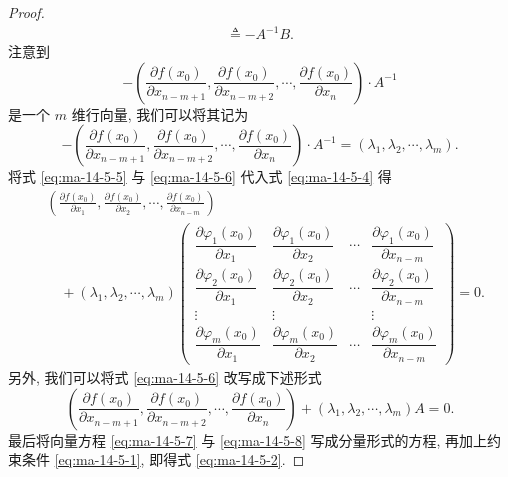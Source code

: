 \begin{proof}
\begin{equation}
\begin{aligned}
  \triangleq -A^{-1}B.
\end{aligned}
\label{eq:ma-14-5-5}
\end{equation}
注意到
\[
  -
  \left(
    \frac{\partial f(x_0)}{\partial x_{n-m+1}},
    \frac{\partial f(x_0)}{\partial x_{n-m+2}},
    \cdots,
    \frac{\partial f(x_0)}{\partial x_n}
  \right)\cdot A^{-1}
\]
是一个 $m$ 维行向量, 我们可以将其记为
\begin{equation}
  -
  \left(
    \frac{\partial f(x_0)}{\partial x_{n-m+1}},
    \frac{\partial f(x_0)}{\partial x_{n-m+2}},
    \cdots,
    \frac{\partial f(x_0)}{\partial x_n}
  \right)\cdot A^{-1}
  =(\lambda_1,\lambda_2,\cdots,\lambda_m).
  \label{eq:ma-14-5-6}
\end{equation}
将式 \eqref{eq:ma-14-5-5} 与 \eqref{eq:ma-14-5-6} 代入式 \eqref{eq:ma-14-5-4} 得
\begin{equation}
\begin{aligned}
  &\left(
    \frac{\partial f(x_0)}{\partial x_1},
    \frac{\partial f(x_0)}{\partial x_2},
    \cdots,
    \frac{\partial f(x_0)}{\partial x_{n-m}}
  \right)\\
  &\quad+
  (\lambda_1,\lambda_2,\cdots,\lambda_m)
  \begin{pmatrix}
    \dfrac{\partial\varphi_1(x_0)}{\partial x_1} &
    \dfrac{\partial\varphi_1(x_0)}{\partial x_2} &
    \cdots &
    \dfrac{\partial\varphi_1(x_0)}{\partial x_{n-m}}\\
    \dfrac{\partial\varphi_2(x_0)}{\partial x_1} &
    \dfrac{\partial\varphi_2(x_0)}{\partial x_2} &
    \cdots &
    \dfrac{\partial\varphi_2(x_0)}{\partial x_{n-m}}\\
    \vdots & \vdots & & \vdots\\
    \dfrac{\partial\varphi_m(x_0)}{\partial x_1} &
    \dfrac{\partial\varphi_m(x_0)}{\partial x_2} &
    \cdots &
    \dfrac{\partial\varphi_m(x_0)}{\partial x_{n-m}}
  \end{pmatrix}
  =0.
\end{aligned}
\label{eq:ma-14-5-7}
\end{equation}
另外, 我们可以将式 \eqref{eq:ma-14-5-6} 改写成下述形式
\begin{equation}
  \left(
    \frac{\partial f(x_0)}{\partial x_{n-m+1}},
    \frac{\partial f(x_0)}{\partial x_{n-m+2}},
    \cdots,
    \frac{\partial f(x_0)}{\partial x_n}
  \right)
  +
  (\lambda_1,\lambda_2,\cdots,\lambda_m)
  A=0.
  \label{eq:ma-14-5-8}
\end{equation}
最后将向量方程 \eqref{eq:ma-14-5-7} 与 \eqref{eq:ma-14-5-8} 写成分量形式的方程, 再加上约束条件 \eqref{eq:ma-14-5-1}, 即得式 \eqref{eq:ma-14-5-2}.
\end{proof}


